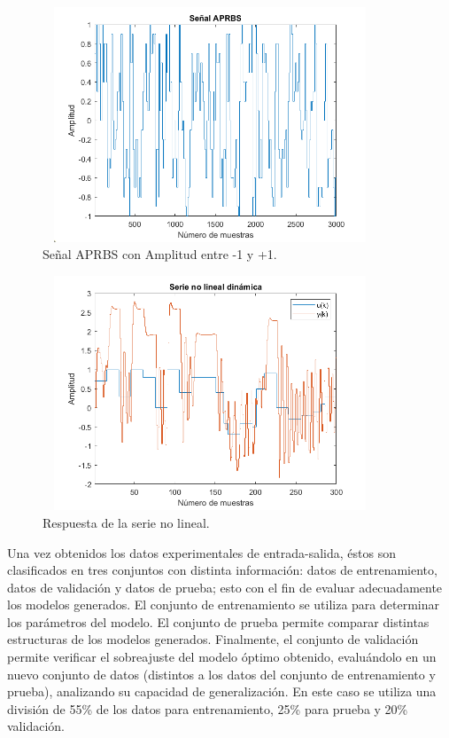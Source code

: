 \documentclass[12pt]{article}
\begin{document}
\begin{figure}
\centering
\includegraphics[width=10cm,height=7cm]{imag/APRBS}
\caption{Señal APRBS con Amplitud entre -1 y +1.}
\label{f_APRBS}
\end{figure}

\begin{figure}
\centering
\includegraphics[width=10cm,height=7cm]{imag/SerieNoLineal}
\caption{Respuesta de la serie no lineal.}
\label{f_SerieNoLineal}
\end{figure}


Una vez obtenidos los datos experimentales de entrada-salida, éstos son clasificados en tres conjuntos con distinta información: datos de entrenamiento, datos
de validación y datos de prueba; esto con el fin de evaluar adecuadamente los modelos
generados. El conjunto de entrenamiento se utiliza para determinar los parámetros del
modelo. El conjunto de prueba permite comparar distintas estructuras de los modelos
generados. Finalmente, el conjunto de validación permite verificar el sobreajuste del
modelo óptimo obtenido, evaluándolo en un nuevo conjunto de datos (distintos a los
datos del conjunto de entrenamiento y prueba), analizando su capacidad de
generalización. En este caso se utiliza una división de 55\% de los datos para entrenamiento, 25\% para prueba y 20\% validación.
\end{document}
